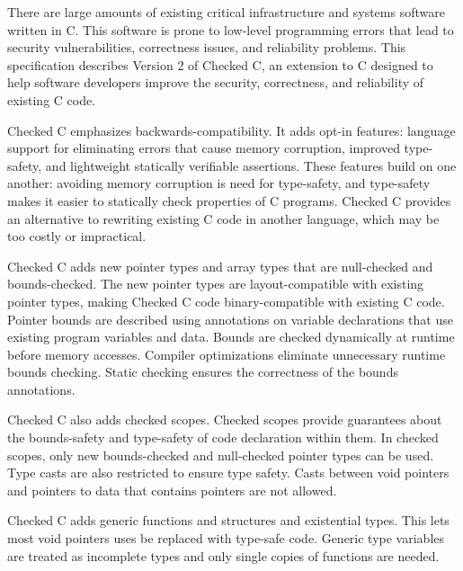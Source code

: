 
\parbox{6.0in}{
There are large amounts of existing critical infrastructure and
systems software written in C. This software is prone to
low-level programming errors that lead to security vulnerabilities,
correctness issues, and reliability problems.  This specification describes
Version 2 of Checked C, an extension to C designed to help software
developers improve the security, correctness, and reliability of
existing C code.
}

\vspace{11pt}

\parbox{6.0in}{Checked C emphasizes backwards-compatibility.
It adds opt-in features: language support for
eliminating errors that cause memory corruption,
improved type-safety, and lightweight statically verifiable assertions.
These features build on one another: avoiding memory corruption
is need for  type-safety, and type-safety makes it easier
to statically check properties of C programs.
Checked C provides an alternative to rewriting existing C code in another
language, which may be too costly or impractical.}

\vspace{11pt}

\parbox{6.0in}{Checked C adds new pointer types and array types that are
null-checked and bounds-checked. The new pointer types
are layout-compatible with existing pointer
types, making Checked C code binary-compatible with existing C code.
Pointer bounds are described using annotations on variable
declarations that use existing program variables and data.
Bounds are checked dynamically at runtime before memory accesses.
Compiler optimizations eliminate unnecessary runtime bounds checking.
Static checking ensures the correctness of the bounds annotations.}

\vspace{11pt}

\parbox{6.0in}{Checked C also adds checked scopes. Checked scopes
provide guarantees about the bounds-safety and type-safety of code
declaration within them. In checked
scopes, only new bounds-checked and null-checked pointer types
can be used.  Type casts are also restricted to ensure type
safety.  Casts between void pointers and pointers to
 data that contains pointers are not allowed.}

\vspace{11pt}

\parbox{6.0in}{Checked C adds generic functions and structures
and existential types. This lets most void pointers uses be replaced
with type-safe code. Generic type variables are treated as incomplete
types and only single copies of functions are needed.}
